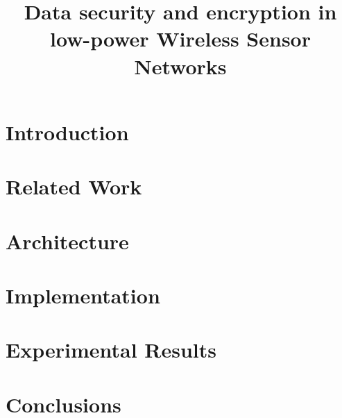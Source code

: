 \documentclass[conference]{IEEEtran}
\begin{document}
\title{Data security and encryption in low-power Wireless Sensor Networks}

\author{
  }


 
\maketitle

\section{Introduction}
\label{sec:introduction}


\section{Related Work}
\label{sec:related}


\section{Architecture}
\label{sec:architecture}


\section{Implementation}
\label{sec:implementation}


\section{Experimental Results}
\label{sec:results}


\section{Conclusions}
\label{sec:conclusions}




\end{document}

